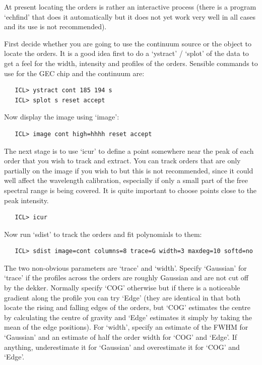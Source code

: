    At present locating the orders is rather an interactive process
   (there is a program `echfind' that does it automatically but it does
   not yet work very well in all cases and its use is not recommended).

   First decide whether you are going to use the continuum source or the
   object to locate the orders. It is a good idea first to do a
   `ystract' / `splot' of the data to get a feel for the width,
   intensity and profiles of the orders. Sensible commands to use for
   the GEC chip and the continuum are:

\begin{verbatim}
   ICL> ystract cont 185 194 s
   ICL> splot s reset accept
\end{verbatim}

   Now display the image using `image':

\begin{verbatim}
   ICL> image cont high=hhhh reset accept
\end{verbatim}

   The next stage is to use `icur' to define a point somewhere near the
   peak of each order that you wish to track and extract. You can track
   orders that are only partially on the image if you wish to but this
   is not recommended, since it could well affect the wavelength
   calibration, especially if only a small part of the free spectral
   range is being covered. It is quite important to choose points close
   to the peak intensity.

\begin{verbatim}
   ICL> icur
\end{verbatim}

   Now run `sdist' to track the orders and fit polynomials to them:

\begin{verbatim}
   ICL> sdist image=cont columns=8 trace=G width=3 maxdeg=10 softd=no
\end{verbatim}

   The two non-obvious parameters are `trace' and `width'. Specify
   `Gaussian' for `trace' if the profiles across the orders are roughly
   Gaussian and are not cut off by the dekker. Normally specify `COG'
   otherwise but if there is a noticeable gradient along the profile you
   can try `Edge' (they are identical in that both locate the rising and
   falling edges of the orders, but `COG' estimates the centre by
   calculating the centre of gravity and `Edge' estimates it simply by
   taking the mean of the edge positions). For `width', specify an
   estimate of the FWHM for `Gaussian' and an estimate of half the order
   width for `COG' and `Edge'. If anything, underestimate it for
   `Gaussian' and overestimate it for `COG' and `Edge'.

